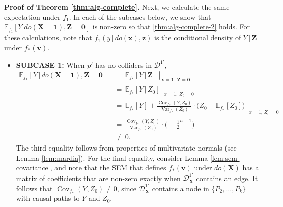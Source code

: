 \documentclass[11pt]{article}
\DeclareMathOperator{\Var}{Var}
\DeclareMathOperator{\Cov}{Cov}
\newcommand{\mb}[1]{\mathbf{#1}}
\newcommand{\g}[1][G]{\mathcal{#1}}
\newcommand{\E}{\mathbb{E}}
\newenvironment{proofofnoqed}[1][]{\noindent \textbf{Proof of #1.}}{}
\begin{document}
\begin{proofofnoqed}[Theorem \ref{thm:alg-complete}]
    Next, we calculate the same expectation under $f_1$. In each of the subcases below, we show that $\E_{f_1}[Y | do(\mb{X}= \mb{1}), \mb{Z} = \mb{0}]$ is non-zero so that \eqref{thm:alg-complete-2} holds. For these calculations, note that $f_1(y \,|\, do(\mb{x}), \mb{z} )$ is the conditional density of $Y \,|\, \mb{Z}$ under $f_*(\mb{v})$.
    \begin{itemize}
        \item \textbf{SUBCASE 1:}
        When $p'$ has no colliders in $\g[D]^{1'}$,
        \begin{align*}
            \E_{f_1}[Y \,|\, do(\mb{X}= \mb{1}), \mb{Z}= \mb{0}] 
                    &\,=\, \left. \E_{f_*}[Y \,|\, \mb{Z}] \, \right\rvert_{\, \mb{x}=\mb{1}, \, \mb{Z}=\mb{0}}\\
                    &\,=\,  \left. \E_{f_*}[Y \,|\, Z_0] \, \right\rvert_{\, x=1, \, Z_0=0}\\
                    &\,=\,  \left. \E_{f_*}[Y] + \frac{\Cov_{f_*}(Y,Z_0)}{\Var_{f_*}(Z_0)} \cdot \Big(Z_0 - \E_{f_*}[Z_0]\Big) \, \right\rvert_{\, x=1, \, Z_0=0}\\
                    &\,=\,  \frac{\Cov_{f_*}(Y,Z_0)}{\Var_{f_*}(Z_0)} \cdot \big(- \tfrac{1}{2}^{n -1}\big) \\
                    &\,\neq\, 0.
        \end{align*}
        The third equality follows from properties of multivariate normals (see Lemma \ref{lem:mardia}). For the final equality, consider Lemma \ref{lem:sem-covariance}, and note that the SEM that defines $f_*(\mb{v})$ under $do(\mb{X})$ has a matrix of coefficients that are non-zero exactly when $\g[D]^{1'}_{\overline{\mb{X}}}$ contains an edge. It follows that $\Cov_{f_*}(Y,Z_0) \neq 0$, since $\g[D]^{1'}_{\overline{\mb{X}}}$ contains a node in $\{P_2, \dots, P_k\}$ with causal paths to $Y$ and $Z_0$.


\end{itemize}
\end{proofofnoqed}
\end{document}
